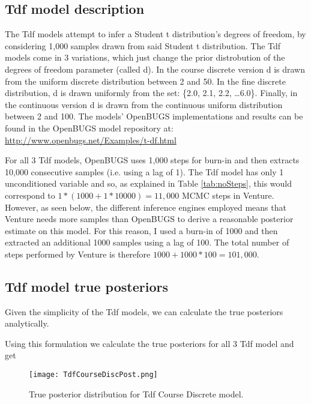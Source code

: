 \subsection{Tdf model description}
The Tdf models attempt to infer a Student t distribution's degrees of freedom, by considering 1,000 samples drawn from said Student t distribution. The Tdf models come in 3 variations, which just change the prior distrobution of the degrees of freedom parameter (called d). In the course discrete version d is drawn from the uniform discrete distribution between 2 and 50. In the fine discrete distribution, d is drawn uniformly from the set: \{2.0, 2.1, 2.2, \ldots 6.0\}. Finally, in the continuous version d is drawn from the continuous uniform distribution between 2 and 100. The models' OpenBUGS implementations and results can be found in the OpenBUGS model repository at: \url{http://www.openbugs.net/Examples/t-df.html}

For all 3 Tdf models, OpenBUGS uses 1,000 steps for burn-in and then extracts 10,000 consecutive samples (i.e. using a lag of 1). The Tdf model has only 1 unconditioned variable and so, as explained in Table \ref{tab:noSteps}, this would correspond to \( 1 * (1000 + 1 * 10000) = 11,000 \) MCMC steps in Venture. However, as seen below, the different inference engines employed means that Venture needs more samples than OpenBUGS to derive a reasonable posterior estimate on this model. For this reason, I used a burn-in of 1000 and then extracted an additional 1000 samples using a lag of 100. The total number of steps performed by Venture is therefore \( 1000 + 1000 * 100 = 101,000 \).

\subsection{Tdf model true posteriors}
Given the simplicity of the Tdf models, we can calculate the true posteriors analytically.


Using this formulation we calculate the true posteriors for all 3 Tdf model and get

\begin{figure}[H]
    \centering
    \texttt{[image: TdfCourseDiscPost.png]}
    \caption{True posterior distribution for Tdf Course Discrete model.}
    \label{fig:tdfCourseDiscSamp}
\end{figure}

